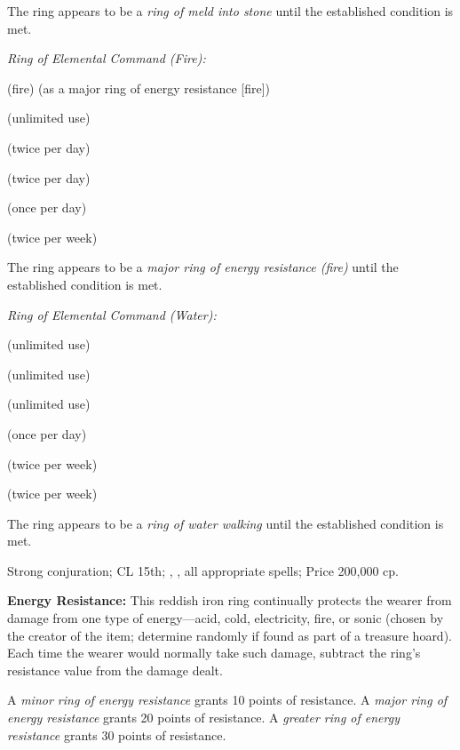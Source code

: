 The ring appears to be a \emph{ring of meld into stone} until the established condition is met.

\textit{Ring of Elemental Command (Fire):}
\begin{itemize*}
\item {} (fire) (as a major ring of energy resistance [fire])
\item {} (unlimited use)
\item {} (twice per day)
\item {} (twice per day)
\item {} (once per day)
\item {} (twice per week)
\end{itemize*}

The ring appears to be a \emph{major ring of energy resistance (fire)} until the established condition is met.

\textit{Ring of Elemental Command (Water):}
\begin{itemize*}
\item {} (unlimited use)
\item {} (unlimited use)
\item {} (unlimited use)
\item {} (once per day)
\item {} (twice per week)
\item {} (twice per week)
\end{itemize*}

The ring appears to be a \emph{ring of water walking} until the established condition is met.

Strong conjuration; CL 15th; , , all appropriate spells; Price 200,000 cp.

\textbf{Energy Resistance:} This reddish iron ring continually protects the wearer from damage from one type of energy---acid, cold, electricity, fire, or sonic (chosen by the creator of the item; determine randomly if found as part of a treasure hoard). Each time the wearer would normally take such damage, subtract the ring's resistance value from the damage dealt.

A \emph{minor ring of energy resistance} grants 10 points of resistance. A \emph{major ring of energy resistance} grants 20 points of resistance. A \emph{greater ring of energy resistance} grants 30 points of resistance.

